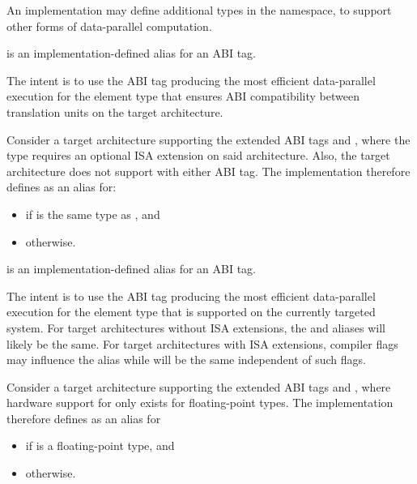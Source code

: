\pnum
An implementation may define additional  types in the  namespace, to support other forms of data-parallel computation.

\pnum
{} is an implementation-defined alias for an ABI tag. \begin{note}The intent is to use the ABI tag producing the most efficient data-parallel execution for the element type  that ensures ABI compatibility between translation units on the target architecture.\end{note}
\begin{example}
  Consider a target architecture supporting the extended ABI tags  and , where the  type requires an optional ISA extension on said architecture. Also, the target architecture does not support  with either ABI tag. The implementation therefore defines  as an alias for:
  \begin{itemize}
    \item {} if  is the same type as , and
    \item {} otherwise.
  \end{itemize}
\end{example}

\pnum
{} is an implementation-defined alias for an ABI tag. \begin{note}The intent is to use the ABI tag producing the most efficient data-parallel execution for the element type  that is supported on the currently targeted system. For target architectures without ISA extensions, the  and  aliases will likely be the same. For target architectures with ISA extensions, compiler flags may influence the  alias while  will be the same independent of such flags.\end{note}
\begin{example}
  Consider a target architecture supporting the extended ABI tags  and , where hardware support for  only exists for floating-point types. The implementation therefore defines  as an alias for
  \begin{itemize}
    \item {} if  is a floating-point type, and
    \item {} otherwise.
  \end{itemize}
\end{example}


